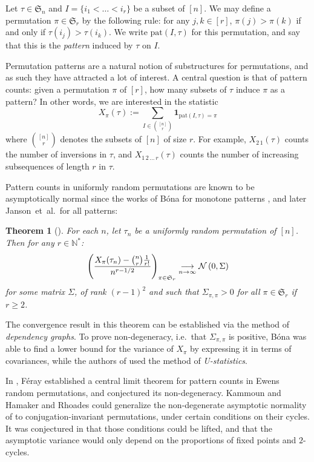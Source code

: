 \documentclass{article}
\newtheorem{theorem}{Theorem}[section]
\theoremstyle{remark}
\def\N{\mathbb{N}}
\def\m{\!-\!}
\newcommand{\cv}[2]{\underset{#1\to#2}{\longrightarrow}}
\newcommand{\One}[1]{\mathbf{1}_{#1}}
\newcommand{\Normal}[2]{{\cal N}\left(#1 , #2\right)}
\def\S{\mathfrak{S}}
\def\pat{\mathrm{pat}}
\begin{document}
Let $\tau\in\S_n$ and $I=\{i_1<\dots<i_r\}$ be a subset of $[n]$.
We may define a permutation $\pi\in\S_r$ by the following rule:
for any $j,k\in[r]$, $\pi(j)>\pi(k)$ if and only if $\tau(i_j)>\tau(i_k)$.
We write $\pat(I,\tau)$ for this permutation, and say that this is the {\em pattern} induced by $\tau$ on $I$.

Permutation patterns are a natural notion of substructures for permutations, and as such they have attracted a lot of interest.
A central question is that of pattern counts: given a permutation $\pi$ of $[r]$, how many subsets of $\tau$ induce $\pi$ as a pattern?
In other words, we are interested in the statistic
\begin{equation*}
    X_\pi(\tau) := \sum_{I\in\binom{[n]}{r}} \One{\pat(I,\tau) = \pi}
\end{equation*}
where $\binom{[n]}{r}$ denotes the subsets of $[n]$ of size $r$.
For example, $X_{2\,1}(\tau)$ counts the number of inversions in $\tau$,
and $X_{1\,2\,\dots\,r}(\tau)$ counts the number of increasing subsequences of length $r$ in $\tau$.

Pattern counts in uniformly random permutations are known to be asymptotically normal since the works of B\'ona for monotone patterns \cite{B10}, and later Janson~et~al.~for all patterns:
\begin{theorem}[\cite{JNZ15}]\label{th: pattern counts in uniform}
    For each $n$, let $\tau_n$ be a uniformly random permutation of $[n]$.
    Then for any $r\in\N^*$:
    \begin{equation*}
        \left( \frac{X_\pi(\tau_n)-\binom{n}{r}\frac{1}{r!}}{n^{r-1/2}} \right)_{\pi\in\S_r}
        \cv{n}{\infty} \Normal{0}{\Sigma}
    \end{equation*}
    for some matrix $\Sigma$, of rank $(r\m1)^2$ and such that $\Sigma_{\pi,\pi}>0$ for all $\pi\in\S_r$ if $r\ge2$.
\end{theorem}

The convergence result in this theorem can be established via the method of {\em dependency graphs}.
To prove non-degeneracy, i.e.~that $\Sigma_{\pi,\pi}$ is positive, B\'ona was able to find a lower bound for the variance of $X_\pi$ by expressing it in terms of covariances, while the authors of \cite{JNZ15} used the method of {\em U-statistics}.

In \cite{F13}, F\'eray established a central limit theorem for pattern counts in Ewens random permutations, and conjectured its non-degeneracy.
Kammoun \cite[Proposition~31]{K22} and Hamaker and Rhoades \cite[Theorem~8.8]{HR22} could generalize the non-degenerate asymptotic normality of  to conjugation-invariant permutations, under certain conditions on their cycles.
It was conjectured in \cite[Problem~9.9]{HR22} that those conditions could be lifted, and that the asymptotic variance would only depend on the proportions of fixed points and $2$-cycles.
\end{document}
